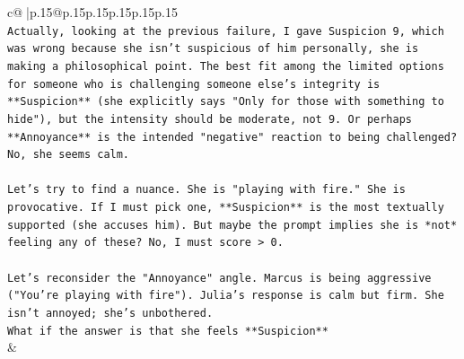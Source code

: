 \documentclass{article}
\begin{document}
{\begin{supertabular}{c@{$\;$}|p{.15\linewidth}@{}p{.15\linewidth}p{.15\linewidth}p{.15\linewidth}p{.15\linewidth}p{.15\linewidth}}
{{{\\ 
\texttt{Actually, looking at the previous failure, I gave Suspicion 9, which was wrong because she isn't suspicious of him personally, she is making a philosophical point. The best fit among the limited options for someone who is challenging someone else's integrity is **Suspicion** (she explicitly says "Only for those with something to hide"), but the intensity should be moderate, not 9. Or perhaps **Annoyance** is the intended "negative" reaction to being challenged? No, she seems calm.} \\
\\ 
\texttt{Let's try to find a nuance. She is "playing with fire." She is provocative. If I must pick one, **Suspicion** is the most textually supported (she accuses him). But maybe the prompt implies she is *not* feeling any of these? No, I must score > 0.} \\
\\ 
\texttt{Let's reconsider the "Annoyance" angle. Marcus is being aggressive ("You're playing with fire"). Julia's response is calm but firm. She isn't annoyed; she's unbothered.} \\
\texttt{What if the answer is that she feels **Suspicion**} \\
            }
        }
    }
    & \\ \\

\end{supertabular}
}
\end{document}
